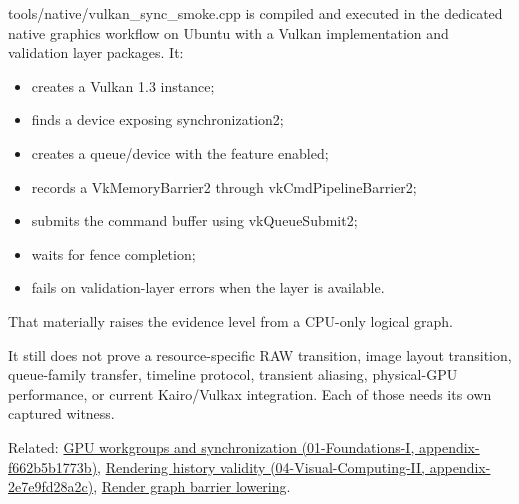 tools/native/vulkan\_sync\_smoke.cpp is compiled and executed in the dedicated native graphics workflow on Ubuntu with a Vulkan implementation and validation layer packages. It:

\begin{itemize}
\tightlist
\item
  creates a Vulkan 1.3 instance;
\item
  finds a device exposing synchronization2;
\item
  creates a queue/device with the feature enabled;
\item
  records a VkMemoryBarrier2 through vkCmdPipelineBarrier2;
\item
  submits the command buffer using vkQueueSubmit2;
\item
  waits for fence completion;
\item
  fails on validation-layer errors when the layer is available.
\end{itemize}

That materially raises the evidence level from a CPU-only logical graph.

It still does not prove a resource-specific RAW transition, image layout transition, queue-family transfer, timeline protocol, transient aliasing, physical-GPU performance, or current Kairo/Vulkax integration. Each of those needs its own captured witness.

Related: \href{../01-Foundations-I/main.pdf\#nameddest=appendix-f662b5b1773b}{GPU workgroups and synchronization (01-Foundations-I, appendix-f662b5b1773b)}, \href{../04-Visual-Computing-II/main.pdf\#nameddest=appendix-2e7e9fd28a2c}{Rendering history validity (04-Visual-Computing-II, appendix-2e7e9fd28a2c)}, \hyperref[appendix-0fc95374cb7e]{Render graph barrier lowering}.
